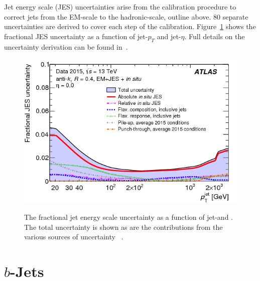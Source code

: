 Jet energy scale (JES) uncertainties arise from the calibration procedure
to correct jets from the EM-scale to the hadronic-scale, outline above.
80 separate uncertainties are derived to cover each step of the calibration.
Figure~\ref{fig:obj-jets_calib_JES} shows the fractional JES uncertainty as a function of jet-$p_T$ and jet-$\eta$.
Full details on the uncertainty derivation can be found in~\cite{obj-jets_calib_run2}.

\begin{figure}[!ht]
  \begin{center}
    \captionsetup[subfigure]{aboveskip=0pt,justification=centering}
     {\includegraphics[width=0.48\linewidth, angle=0]{figs/Objects/jets_uncert_JES_pt.png} }
  \end{center}
  \caption[The fractional jet energy scale uncertainty as a function of jet-\pT and \eta.
    The total uncertainty is shown as are the contributions from the various sources of uncertainty.]
          {The fractional jet energy scale uncertainty as a function of jet-\pT and \eta.
            The total uncertainty is shown as are the contributions from the various sources of uncertainty ~\cite{obj-jets_calib_run2}.}
  \label{fig:obj-jets_calib_JES}
\end{figure}

\FloatBarrier

\newpage
\section{$b$-Jets}
\label{sec:obj-bjets}

